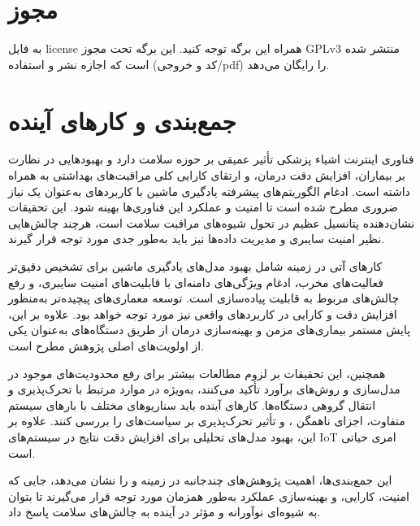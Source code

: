 \documentclass[a4paper]{article}
\begin{document}


\tableofcontents
\listoffigures
\listoftables

\section*{مجوز}

به فایل license همراه این برگه توجه کنید. این برگه تحت مجوز GPLv3 منتشر شده است
که اجازه نشر و استفاده (کد و خروجی/pdf) را رایگان می‌دهد.

\newpage

\newpage

\section{جمع‌بندی و کار‌های آینده}

فناوری اینترنت اشیاء پزشکی  تأثیر عمیقی بر حوزه سلامت دارد و
بهبودهایی در نظارت بر بیماران، افزایش دقت درمان، و ارتقای کارایی کلی مراقبت‌های
بهداشتی به همراه داشته است. ادغام الگوریتم‌های پیشرفته یادگیری ماشین با
کاربردهای  به‌عنوان یک نیاز ضروری مطرح شده است تا امنیت و عملکرد این
فناوری‌ها بهینه شود.  این تحقیقات نشان‌دهنده پتانسیل عظیم  در تحول
شیوه‌های مراقبت سلامت است، هرچند چالش‌هایی نظیر امنیت سایبری و مدیریت داده‌ها
نیز باید به‌طور جدی مورد توجه قرار گیرند.

کارهای آتی در زمینه  شامل بهبود مدل‌های یادگیری ماشین برای تشخیص
دقیق‌تر فعالیت‌های مخرب، ادغام ویژگی‌های دامنه‌ای با قابلیت‌های امنیت سایبری، و
رفع چالش‌های مربوط به قابلیت پیاده‌سازی است. توسعه معماری‌های پیچیده‌تر به‌منظور
افزایش دقت و کارایی در کاربردهای واقعی نیز مورد توجه خواهد بود. علاوه بر این،
پایش مستمر بیماری‌های مزمن و بهینه‌سازی درمان از طریق دستگاه‌های 
به‌عنوان یکی از اولویت‌های اصلی پژوهش مطرح است.

همچنین، این تحقیقات بر لزوم مطالعات بیشتر برای رفع محدودیت‌های موجود در مدل‌سازی
 و روش‌های برآورد  تأکید می‌کنند، به‌ویژه در موارد مرتبط با
تحرک‌پذیری و انتقال گروهی دستگاه‌ها. کارهای آینده باید سناریوهای مختلف با بارهای
سیستم متفاوت، اجزای ناهمگن ، و تأثیر تحرک‌پذیری بر سیاست‌های
 را بررسی کنند. علاوه بر این، بهبود مدل‌های تحلیلی برای افزایش
دقت نتایج در سیستم‌های IoT امری حیاتی است.

این جمع‌بندی‌ها، اهمیت پژوهش‌های چندجانبه در زمینه  و  را نشان
می‌دهد، جایی که امنیت، کارایی، و بهینه‌سازی عملکرد به‌طور همزمان مورد توجه قرار
می‌گیرند تا بتوان به شیوه‌ای نوآورانه و مؤثر در آینده به چالش‌های سلامت پاسخ
داد.

\newpage


\end{document}
